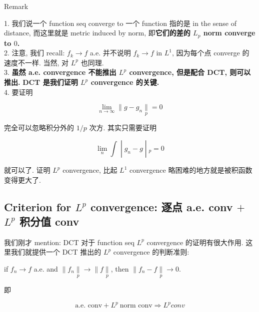 \begin{qlremark}{Remark}

1. 我们说一个 function seq converge to 一个 function 指的是 in the sense of distance, 而这里就是 metric induced by norm, 即\textbf{它们的差的 \(L_{p}\) norm converge to \(0\).}\\
2. 注意, 我们 recall: \(f_{k}\rightarrow f\) a.e. 并不说明 \(f_{k}\rightarrow f\) in \(L^{1}\), 因为每个点 converge 的速度不一样. 当然, 对 \(L^{p}\) 也同理.\\
3. \textbf{虽然 a.e. convergence 不能推出 \(L^{p}\) convergence, 但是配合 DCT, 则可以推出.} \textbf{DCT 是我们证明 \(L^{p}\) convergence 的关键.}\\
4. 要证明

\[\lim\limits_{n\rightarrow\infty} \parallel g - g_{n}\underset{p}{\parallel} = 0\]

完全可以忽略积分外的 \(1/p\) 次方. 其实只需要证明

\[\left. \lim\limits_{n}\int \middle| g_{n} - g \middle| {}_{p} = 0 \right.\]

就可以了. 证明 \(L^{p}\) convergence, 比起 \(L^{1}\) convergence 略困难的地方就是被积函数变得更大了.

\end{qlremark}

\subsection{\texorpdfstring{Criterion for \(L^{p}\) convergence: 逐点 a.e. conv \(+\) \(L^{p}\) 积分值 conv}{Criterion for L\^{}\{p\} convergence: 逐点 a.e. conv + L\^{}\{p\} 积分值 conv}}\label{criterion-for-lp-convergence-ux9010ux70b9-a.e.-conv-lp-ux79efux5206ux503c-conv}

我们刚才 mention: DCT 对于 function seq \(L^{p}\) convergence 的证明有很大作用. 这里我们就提供一个 DCT 推出的 \(L^{p}\) convergence 的判断准则:

\begin{theorem}{}

if \(f_{n}\rightarrow f\) a.e. and \(\parallel f_{n}\underset{p}{\parallel}\rightarrow \parallel f\underset{p}{\parallel}\), then \(\parallel f_{n} - f\underset{p}{\parallel}\rightarrow 0\).

\end{theorem}

即

\[\text{a.e. conv} + L^{p}\ \text{norm conv}\Longrightarrow L^{p}conv\]

